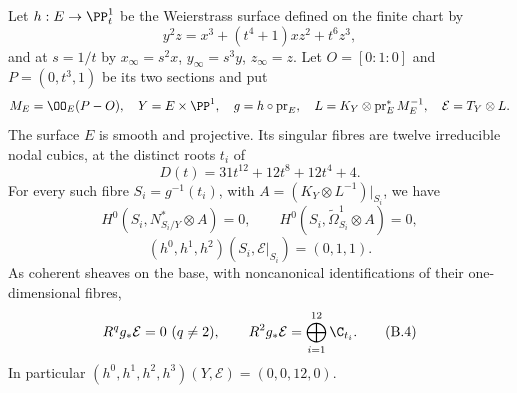 
\begin{proposition}\label{cdp:st:B2}
Let $h:E\to\PP^1_t$ be the Weierstrass surface defined on the finite chart by
\[
 y^2z=x^3+(t^4+1)xz^2+t^6z^3,                          \tag{B.3}\label{cdp:eq:B.3}
\]
and at $s=1/t$ by $x_\infty=s^2x$, $y_\infty=s^3y$, $z_\infty=z$. Let $O=[0:1:0]$ and $P=(0,t^3,1)$ be its two sections and put
\[
 M_E=\OO_E(P-O),\quad Y=E\times\PP^1,\quad
 g=h\circ\operatorname{pr}_E,\quad
 L=K_Y\otimes\operatorname{pr}_E^*M_E^{-1},\quad
 \mathcal E=T_Y\otimes L.
\]
The surface $E$ is smooth and projective. Its singular fibres are twelve irreducible nodal cubics, at the distinct roots $t_i$ of
\[
 D(t)=31t^{12}+12t^8+12t^4+4.
\]
For every such fibre $S_i=g^{-1}(t_i)$, with $A=(K_Y\otimes L^{-1})|_{S_i}$, we have
\[
H^0(S_i,N^*_{S_i/Y}\otimes A)=0,
\qquad H^0(S_i,\widetilde\Omega^1_{S_i}\otimes A)=0,
\]
\[
 (h^0,h^1,h^2)(S_i,\mathcal E|_{S_i})=(0,1,1).
\]
As coherent sheaves on the base, with noncanonical identifications of their one-dimensional fibres,
\[
 R^qg_*\mathcal E=0\ (q\ne2),\qquad
 R^2g_*\mathcal E=\bigoplus_{i=1}^{12}\C_{t_i}.        \tag{B.4}\label{cdp:eq:B.4}
\]
In particular $(h^0,h^1,h^2,h^3)(Y,\mathcal E)=(0,0,12,0)$.
\end{proposition}

